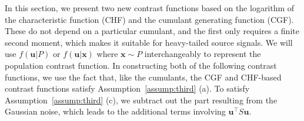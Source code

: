 \documentclass[letterpaper]{article}
\newcommand{\bu}{\pmb{u}}
\newcommand{\bx}{\pmb{x}}
\newcommand{\bk}{\color{black}}
\begin{document}
In this section, we present two new contrast functions based on the logarithm of the characteristic function (CHF) and the cumulant generating function (CGF). These do not depend on a particular cumulant, and the first only requires a finite second moment, which makes it suitable for heavy-tailed source signals.
\bk
We will use $f(\bu|P)$ or $f(\bu|\bx)$ where $\bx\sim P$ interchangeably to represent the population contrast function. In constructing both of the following contrast functions, we use the fact that, like the cumulants, the CGF and CHF-based contrast functions satisfy Assumption~\ref{assump:third} (a). To satisfy Assumption~\ref{assump:third} (c), we subtract out the part resulting from the Gaussian noise, which leads to the additional terms involving $\bu^{\top}S\bu$.
\end{document}
